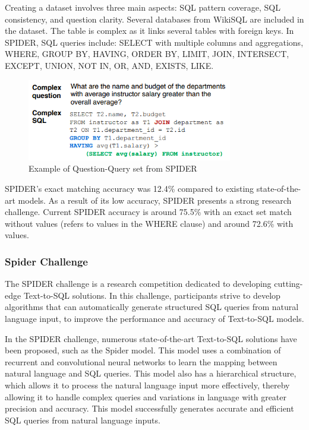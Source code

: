 Creating a dataset involves three main aspects: SQL pattern coverage, SQL consistency, and question clarity. Several databases from WikiSQL are included in the dataset. The table is complex as it links several tables with foreign keys. In SPIDER, SQL queries include: SELECT with multiple columns and aggregations, WHERE, GROUP BY, HAVING, ORDER BY, LIMIT, JOIN, INTERSECT, EXCEPT, UNION, NOT IN, OR, AND, EXISTS, LIKE.

\begin{figure}[htb]
    \centering
    \includegraphics[width=0.8\textwidth]{pics/db/Spider2.png}
    \caption{Example of Question-Query set from SPIDER\cite{yu_spider_2019}}
    \label{fig:Spider2}
\end{figure}

SPIDER's exact matching accuracy was 12.4\% compared to existing state-of-the-art models. As a result of its low accuracy, SPIDER presents a strong research challenge. Current SPIDER accuracy is around 75.5\% with an exact set match without values (refers to values in the WHERE clause) and around 72.6\% with values.

\subsubsection{Spider Challenge}

The SPIDER challenge is a research competition dedicated to developing cutting-edge Text-to-SQL solutions. In this challenge, participants strive to develop algorithms that can automatically generate structured SQL queries from natural language input, to improve the performance and accuracy of Text-to-SQL models.

In the SPIDER challenge, numerous state-of-the-art Text-to-SQL solutions have been proposed, such as the Spider model. This model uses a combination of recurrent and convolutional neural networks to learn the mapping between natural language and SQL queries. This model also has a hierarchical structure, which allows it to process the natural language input more effectively, thereby allowing it to handle complex queries and variations in language with greater precision and accuracy. This model successfully generates accurate and efficient SQL queries from natural language inputs.

